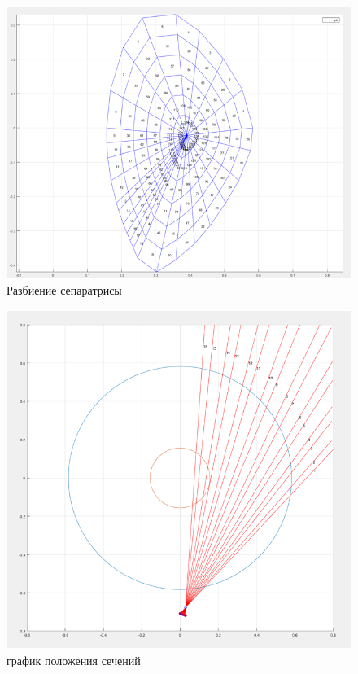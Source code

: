 \documentclass[a4]{article}
\begin{document}
\begin{figure}[H]
\begin{center}
\caption{Разбиение сепаратрисы}
\includegraphics{pic3.png} 
\end{center}
\end{figure}


\begin{figure}[H]
\begin{center}
\caption{график положения сечений}
\includegraphics{pic4.png} 
\end{center}
\end{figure}
\end{document}

